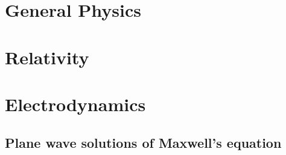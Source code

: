 \part{General Physics}
   
   
   
   
   
   
   
   
   
   
   

\part{Relativity}
   
   
   
   
   
   
   
   

\part{Electrodynamics}
   
   
   
   
   
   
   
   
   
   
   
   
   
   
   
   
   
   
   
   
   
   
   

   \chapter{Plane wave solutions of Maxwell's equation}
      
